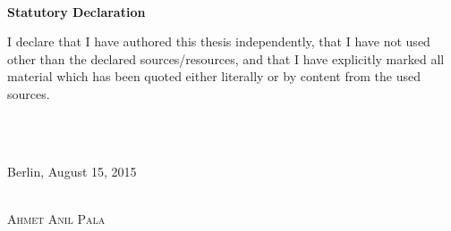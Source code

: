 \documentclass[11pt, a4paper, oneside]{Thesis} %
\begin{document}
\ \\

\textbf{Statutory Declaration}

I declare that I have authored this thesis independently, that I have not used 
other than the declared sources/resources, and that I have explicitly marked 
all material which has been quoted either literally or by content from the used sources.

\ \\ \ \\

\begin{flushright} 

Berlin, August 15, 2015

\ \\

\textsc{Ahmet Anil Pala}

\end{flushright}

\newpage







 
 
\end{document}
